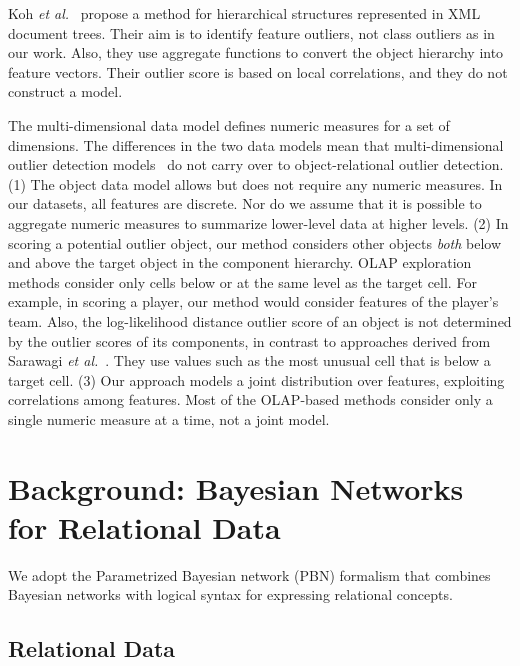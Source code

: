 {				
				Koh {\em et al.}~\cite{Koh2008} propose a method for hierarchical structures represented in XML document trees. Their aim is to identify feature outliers, not class outliers as in our work. Also, they use aggregate functions to convert the object hierarchy into feature vectors. Their outlier score is based on local correlations, and they do not construct a model.
				
				
				The multi-dimensional data model defines numeric measures for a set of dimensions. 
				The differences in the two data models mean that multi-dimensional outlier detection models~\cite{Sarawagi1998} do not carry over to object-relational outlier detection. (1) The object data model allows but does not require any numeric measures. In our datasets, all features are discrete. Nor do we assume that it is possible to aggregate numeric measures to summarize lower-level data at higher levels.  
				(2) In scoring a potential outlier object, our method considers other objects {\em both} below and above the target object in the component hierarchy. OLAP exploration methods consider only cells below or at the same level as the target cell. For example, in scoring a player, our method would consider features of the player's team.  
				Also, the log-likelihood distance outlier score of an object is not determined by the outlier scores of its components, in contrast to approaches derived from Sarawagi {\em et al.}~\cite{Sarawagi1998}. They use values such as the most unusual cell that is below a target cell.
				(3) Our approach models a joint distribution over features, exploiting correlations among features. Most of the OLAP-based methods consider only a single numeric measure at a time, not a joint model.  




\section{Background: Bayesian Networks for Relational Data}
We adopt  
the Parametrized Bayesian network (PBN) formalism \cite{Poole2003} that combines Bayesian networks with logical syntax for expressing relational concepts. 


\subsection{Relational Data}




}
